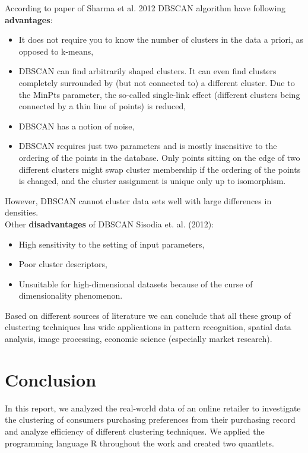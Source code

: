 \documentclass[a4paper,12pt,fleqn]{article}
\begin{document}
According to paper of Sharma et al. 2012 DBSCAN algorithm have following 
\textbf{advantages}:
\begin{itemize}
\item It does not require you to know the number of clusters in the data a priori, as opposed to k-means,
\item DBSCAN can find arbitrarily shaped clusters. It can even find clusters completely surrounded by (but not connected to) a different cluster. Due to the MinPts parameter, the so-called single-link effect (different clusters being connected by a thin line of points) is reduced,
\item DBSCAN has a notion of noise,
\item DBSCAN requires just two parameters and is mostly insensitive to the ordering of the points in the database. Only points sitting on the edge of two different clusters might swap cluster membership if the ordering of the points is changed, and the cluster assignment is unique only up to isomorphism.
\end{itemize} 
However, DBSCAN cannot cluster data sets well with large differences in densities.\\
Other \textbf{disadvantages} of DBSCAN Sisodia et. al. (2012):\\
\begin{itemize}
	\item High sensitivity to the setting of input parameters,
	\item Poor cluster descriptors,
	\item Unsuitable for high-dimensional datasets because of the curse of dimensionality phenomenon. 
\end{itemize}
Based on different sources of literature we can conclude that all these group of clustering techniques has wide applications in pattern recognition, spatial data analysis, image processing, economic science (especially market research).\\

\section{Conclusion}
In this report, we analyzed the real-world data of an online retailer to investigate the clustering of consumers purchasing preferences from their purchasing record and analyze efficiency of different clustering techniques. We applied the programming language R throughout the work and created two quantlets. 
\end{document}
